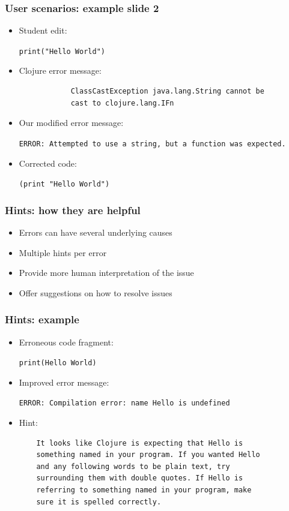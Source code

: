 \documentclass{beamer}
\begin{document}
\begin{frame}[fragile]
\frametitle{User scenarios: example slide 2}

	\begin{itemize}
	\item Student edit:
		
				\texttt{print("Hello World")}
				
		\item Clojure error message:	
			\begin{verbatim}
			ClassCastException java.lang.String cannot be
			cast to clojure.lang.IFn
			\end{verbatim} 
	
		\item Our modified error message:	
	
			\textcolor{PrettyGreen}{
			\texttt{ERROR: Attempted to use a string, but a function
			was expected.}}
	
		\item Corrected code:
		
			\texttt{\alert{(print} "Hello World")}
	\end{itemize} 	

\end{frame}


\begin{frame}
\frametitle{Hints: how they are helpful}
	\begin{itemize}
  	 \item Errors can have several underlying causes
  	 \item Multiple hints per error
  	 \item Provide more human interpretation of the issue
  	 \item Offer suggestions on how to resolve issues
	 \end{itemize}
\end{frame}

\begin{frame}[fragile]
\frametitle{Hints: example}

	\begin{itemize}
		\item Erroneous code fragment:
		
			\texttt{print(Hello World)}

		
			
		\item Improved error message:
		
			\textcolor{PrettyGreen}{
			\texttt{ERROR: Compilation error: name Hello is undefined}}
			
		\item Hint:
		
			\begin{verbatim}
	It looks like Clojure is expecting that Hello is
	something named in your program. If you wanted Hello
	and any following words to be plain text, try
	surrounding them with double quotes. If Hello is
	referring to something named in your program, make
	sure it is spelled correctly.
			\end{verbatim}
	
	\end{itemize}
\end{frame}
\end{document}
